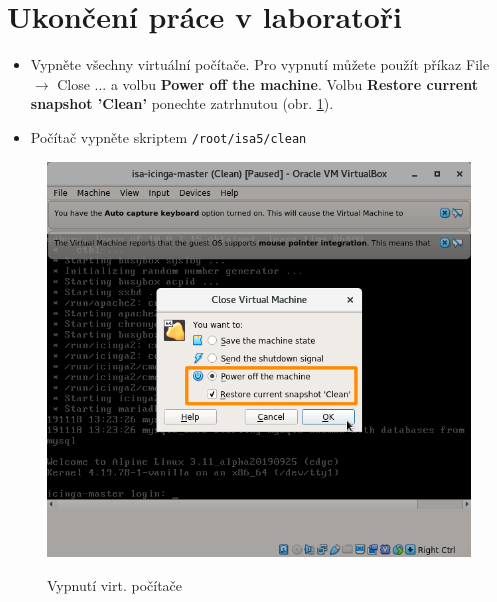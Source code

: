 \section*{Ukončení práce v laboratoři}
\begin{itemize}
  \item Vypněte všechny virtuální počítače. Pro vypnutí můžete použít příkaz File $\rightarrow$ Close ... a volbu {\bf Power off the machine}. Volbu {\bf Restore current snapshot 'Clean'} ponechte zatrhnutou (obr. \ref{fig:shutdown}).
  \item Počítač vypněte skriptem {\tt /root/isa5/clean}
\end{itemize}

\begin{figure}[!ht]
	\caption{Vypnutí virt. počítače}
	\centering
	\includegraphics[width=0.67\linewidth]{files/vbox-shutdown.png}
	\label{fig:shutdown}
\end{figure}
